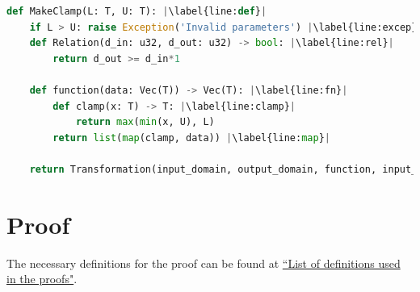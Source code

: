 \documentclass[11pt,a4paper]{article}
\theoremstyle{definition}
\newcommand{\din}{\texttt{d\_in}}
\newcommand{\dout}{\texttt{d\_out}}
\newcommand{\silvia}[1]{{ {\color{blue}{(silvia)~#1}}}}
\begin{document}
\begin{lstlisting}[language=Python, escapechar=|] 
def MakeClamp(L: T, U: T): |\label{line:def}|
    if L > U: raise Exception('Invalid parameters') |\label{line:excep}|
    def Relation(d_in: u32, d_out: u32) -> bool: |\label{line:rel}|
        return d_out >= d_in*1
    
    def function(data: Vec(T)) -> Vec(T): |\label{line:fn}|
        def clamp(x: T) -> T: |\label{line:clamp}|
            return max(min(x, U), L)
        return list(map(clamp, data)) |\label{line:map}|
    
    return Transformation(input_domain, output_domain, function, input_metric, output_metric, stability_relation)
\end{lstlisting}



\smallskip






\section{Proof}
The necessary definitions for the proof can be found at \href{https://www.overleaf.com/project/60d214e390b337703d200982}{``List of definitions used in the proofs"}.
\end{document}
